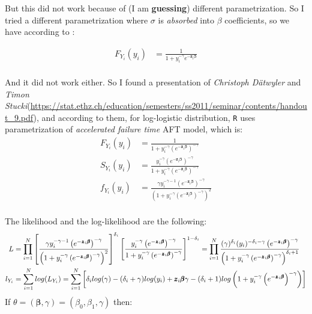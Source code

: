 \documentclass[]{article}
\begin{document}
But this did not work because of (I am \textbf{guessing}) different parametrization. So I tried a different parametrization where $\sigma$ is \emph{absorbed} into $\beta$ coefficients, so we have according to \cite{bennett1983log}:

 $$
 \begin{aligned}
   F_{Y_i}(y_i) &= \frac{  1  }{  1 + y_i^{-\gamma} e^{-\pmb{z}_i\pmb{\beta}}   } \\
  \end{aligned}
  $$
  
And it did not work either. So I found a presentation of \emph{Christoph Dätwyler} and \emph{Timon Stucki}(\url{https://stat.ethz.ch/education/semesters/ss2011/seminar/contents/handout_9.pdf}), and according to them, for log-logistic distribution, \texttt{R} uses parametrization of \emph{accelerated failure time} AFT model, which is:
 $$
 \begin{aligned}
   F_{Y_i}(y_i) &= \frac{  1  }{  1 + y_i^{-\gamma} \left(e^{-\pmb{z}_i\pmb{\beta}} \right)^{-\gamma}   } \\
   S_{Y_i}(y_i) &= \frac{  y_i^{-\gamma}\left(e^{-\pmb{z}_i\pmb{\beta}} \right)^{-\gamma}   }{  1 + y_i^{-\gamma} \left(e^{-\pmb{z}_i\pmb{\beta}} \right)^{-\gamma}   } \\
  f_{Y_i}(y_i) &=   \frac{  \gamma y_i^{-\gamma-1} \left(e^{-\pmb{z}_i\pmb{\beta}} \right)^{-\gamma}  }{  \left(1 + y_i^{-\gamma} \left(e^{-\pmb{z}_i\pmb{\beta}} \right)^{-\gamma} \right)^2   } \\
  \end{aligned}
  $$


The likelihood and the log-likelihood are the following:
  $$
  \begin{aligned}
    L &= \prod_{i=1}^N  \left[    \frac{  \gamma y_i^{-\gamma-1} \left(e^{-\pmb{z}_i\pmb{\beta}} \right)^{-\gamma}  }{  \left(1 + y_i^{-\gamma} \left(e^{-\pmb{z}_i\pmb{\beta}} \right)^{-\gamma} \right)^2   } \right]^{\delta_i} \left[  \frac{  y_i^{-\gamma}\left(e^{-\pmb{z}_i\pmb{\beta}} \right)^{-\gamma}   }{  1 + y_i^{-\gamma} \left(e^{-\pmb{z}_i\pmb{\beta}} \right)^{-\gamma}   }  \right]^{1-\delta_i} = \prod_{i=1}^N      \frac{  (\gamma)^{\delta_i}   (y_i)^{-\delta_i-\gamma}   \left(e^{-\pmb{z}_i\pmb{\beta}} \right)^{-\gamma}   }{  \left(1 + y_i^{-\gamma} \left(e^{-\pmb{z}_i\pmb{\beta}} \right)^{-\gamma}  \right)^{\delta_i + 1}  } \\
    l_{Y_i} &=\sum_{i=1}^N log(L_{Y_i}) =\sum_{i=1}^N  \left[    \delta_i log(\gamma)   - (\delta_i + \gamma) log(y_i) +\pmb{z}_i\pmb{\beta}\gamma   - (\delta_i + 1)log\left(1 + y_i^{-\gamma} \left(e^{-\pmb{z}_i\pmb{\beta}} \right)^{-\gamma} \right)\right]
  \end{aligned}\\
  $$
If $\theta = (\pmb{\beta}, \gamma) = (\beta_0, \beta_1, \gamma)$ then:
\end{document}
